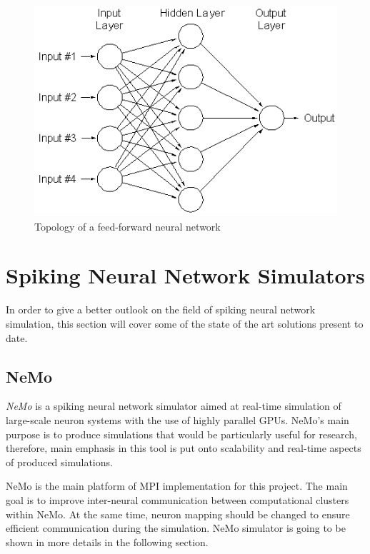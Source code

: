 \begin{figure}[h]
\begin{center}
\includegraphics[scale = 0.3]{images/topology.png}
\end{center}
\caption{Topology of a feed-forward neural network\cite{Tan2006}}
\end{figure}

\section{Spiking Neural Network Simulators}

In order to give a better outlook on the field of spiking neural network simulation, this section will cover some of the state of the art solutions present to date.

\subsection{NeMo}

\emph{NeMo} is a spiking neural network simulator aimed at real-time simulation of large-scale neuron systems with the use of highly parallel GPUs.\cite{AndreasK.Fidjeland2009}
NeMo's main purpose is to produce simulations that would be particularly useful for research, therefore, main emphasis in this tool is put onto scalability and real-time aspects
of produced simulations.

NeMo is the main platform of MPI implementation for this project. The main goal is to improve inter-neural communication between computational clusters within NeMo.
At the same time, neuron mapping should be changed to ensure efficient communication during the simulation. NeMo simulator is going to be shown in more details in the following section.

